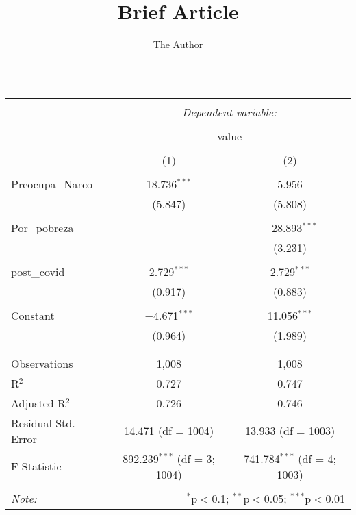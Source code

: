 \documentclass[11pt, oneside]{article}   	%
\title{Brief Article}
\author{The Author}
\begin{document}
\maketitle


\begin{table}[!htbp] \centering 
  \caption{} 
  \label{} 
\begin{tabular}{@{\extracolsep{5pt}}lcc} 
\\[-1.8ex]\hline 
\hline \\[-1.8ex] 
 & \multicolumn{2}{c}{\textit{Dependent variable:}} \\ 
\cline{2-3} 
\\[-1.8ex] & \multicolumn{2}{c}{value} \\ 
\\[-1.8ex] & (1) & (2)\\ 
\hline \\[-1.8ex] 
 Preocupa\_Narco & 18.736$^{***}$ & 5.956 \\ 
  & (5.847) & (5.808) \\ 
  & & \\ 
 Por\_pobreza &  & $-$28.893$^{***}$ \\ 
  &  & (3.231) \\ 
  & & \\ 
 post\_covid & 2.729$^{***}$ & 2.729$^{***}$ \\ 
  & (0.917) & (0.883) \\ 
  & & \\ 
 Constant & $-$4.671$^{***}$ & 11.056$^{***}$ \\ 
  & (0.964) & (1.989) \\ 
  & & \\ 
\hline \\[-1.8ex] 
Observations & 1,008 & 1,008 \\ 
R$^{2}$ & 0.727 & 0.747 \\ 
Adjusted R$^{2}$ & 0.726 & 0.746 \\ 
Residual Std. Error & 14.471 (df = 1004) & 13.933 (df = 1003) \\ 
F Statistic & 892.239$^{***}$ (df = 3; 1004) & 741.784$^{***}$ (df = 4; 1003) \\ 
\hline 
\hline \\[-1.8ex] 
\textit{Note:}  & \multicolumn{2}{r}{$^{*}$p$<$0.1; $^{**}$p$<$0.05; $^{***}$p$<$0.01} \\ 
\end{tabular} 
\end{table}
\end{document}
